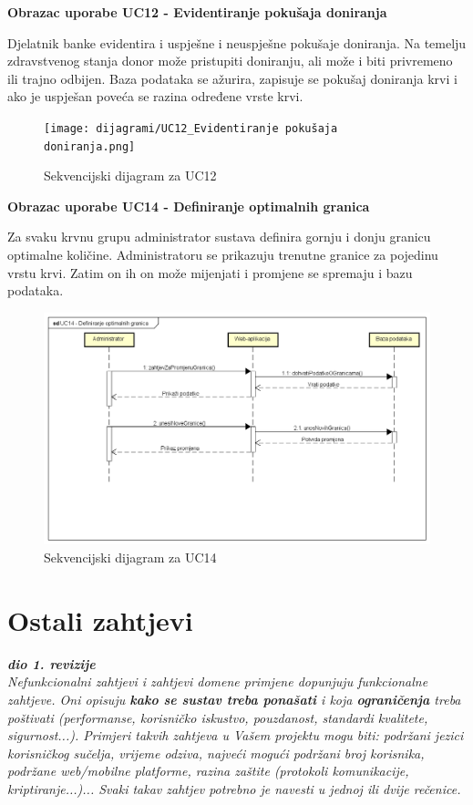 \eject 
\textbf{Obrazac uporabe UC12 - Evidentiranje pokušaja doniranja}

Djelatnik banke evidentira i uspješne i neuspješne pokušaje doniranja. Na temelju zdravstvenog stanja donor može pristupiti doniranju, ali može i biti privremeno ili trajno odbijen. Baza podataka se ažurira, zapisuje se pokušaj doniranja krvi i ako je uspješan poveća se razina određene vrste krvi.

\begin{figure}[H]
	\centering
	\texttt{[image: dijagrami/UC12\_Evidentiranje pokušaja doniranja.png]}
	\caption{Sekvencijski dijagram za UC12}
\end{figure}
\eject

\textbf{Obrazac uporabe UC14 - Definiranje optimalnih granica}

Za svaku krvnu grupu administrator sustava definira gornju i donju granicu optimalne količine. Administratoru se prikazuju trenutne granice za pojedinu vrstu krvi. Zatim on ih on može mijenjati i promjene se spremaju i bazu podataka.

\begin{figure}[H]
	\centering
	\includegraphics[width=\textwidth]{dijagrami/UC14_Definiranje optimalnih granica.png}
	\caption{Sekvencijski dijagram za UC14}
\end{figure}
\eject

\section{Ostali zahtjevi}

\textbf{\textit{dio 1. revizije}}\\

\textit{Nefunkcionalni zahtjevi i zahtjevi domene primjene dopunjuju funkcionalne zahtjeve. Oni opisuju \textbf{kako se sustav treba ponašati} i koja \textbf{ograničenja} treba poštivati (performanse, korisničko iskustvo, pouzdanost, standardi kvalitete, sigurnost...). Primjeri takvih zahtjeva u Vašem projektu mogu biti: podržani jezici korisničkog sučelja, vrijeme odziva, najveći mogući podržani broj korisnika, podržane web/mobilne platforme, razina zaštite (protokoli komunikacije, kriptiranje...)... Svaki takav zahtjev potrebno je navesti u jednoj ili dvije rečenice.}





